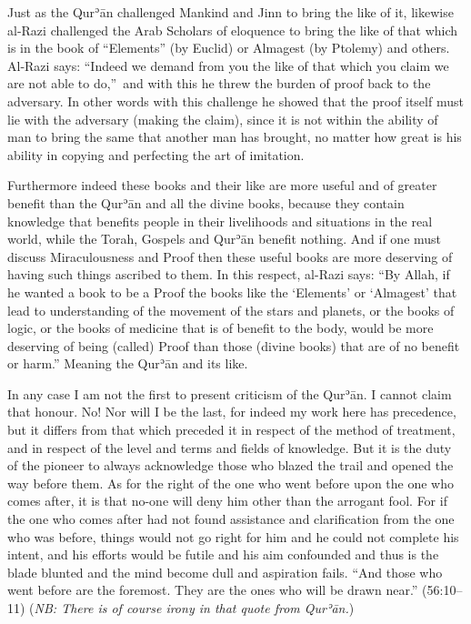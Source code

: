 \documentclass[12pt]{memoir}
\def\´{ʾ} %
\def \Quran{Qur\-\´ān} %
\let \Qrn=\Quran      %
\def\–{-\hskip0pt}
\newcommand{\QRef}[1]{{\color{darkblue}#1}}
\let \fnmark=\footnotemark
\let \fntext=\footnotetext
\newcommand{\NB}[1]{\emph{\small NB: #1}}
\begin{document}
Just as the \Qrn{} challenged Mankind and Jinn to bring the like of it,
likewise al\–Razi challenged the Arab Scholars of eloquence to bring
the like of that which is in the book of “Elements” (by Euclid)
or Almagest (by Ptolemy) and others.
Al\–Razi says: “Indeed we demand from you the like of that which you claim we
are not able to do,”\fnmark\
and with this he threw the burden of proof back to the adversary.
In other words with this challenge he showed that the proof itself must lie
with the adversary (making the claim), since it is not within the ability of
man to bring the same that another man has brought, no matter how great
is his ability in copying and perfecting the art of imitation.

\fntext{Ibidem, p.\ 218.}

Furthermore indeed these books and their like are more useful and of greater
benefit than the \Qrn{} and all the divine books, because they contain
knowledge that benefits people in their livelihoods
and situations in the real world,
while the Torah, Gospels and \Qrn{} benefit nothing.
And if one must discuss Miraculousness and Proof then these useful books
are more deserving of having such things ascribed to them.
In this respect, al\–Razi says: “By Allah, if he wanted a book to be a
Proof the books like the ‘Elements’ or ‘Almagest’ that lead to understanding
of the movement of the stars and planets, or the books of logic,
or the books of medicine that is of benefit to the body,
would be more deserving of being (called) Proof than those (divine books)
that are of no benefit or harm.”\fnmark\@
Meaning the \Qrn{} and its like.

\fntext{Ibidem, p.\ 219.}

In any case I am not the first to present criticism of the \Quran.
I cannot claim that honour.
No! Nor will I be the last, for indeed my work here has precedence,
but it differs from that which preceded it in
respect of the method of treatment,
and in respect of the level and terms and fields of knowledge.
But it is the duty of the pioneer to always acknowledge those
who blazed the trail and opened the way before them.
As for the right of the one who went before upon the one who comes after,
it is that no-one will deny him other than the arrogant fool.
For if the one who comes after had not found assistance and
clarification from the one who was before,
things would not go right for him and he could not complete his intent,
and his efforts would be futile and his aim confounded and
thus is the blade blunted and the mind become dull and aspiration fails.
“And those who went before are the foremost.
They are the ones who will be drawn near.” (\QRef{56:10–11})
(\NB{There is of course irony in that quote from \Quran.})
\end{document}
